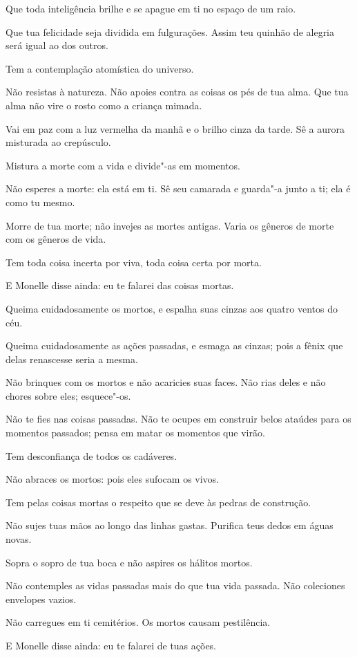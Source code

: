 Que toda inteligência brilhe e se apague em ti no espaço de um raio.

Que tua felicidade seja dividida em fulgurações. Assim teu quinhão de
alegria será igual ao dos outros.

Tem a contemplação atomística do universo.

Não resistas à natureza. Não apoies contra as coisas os pés de tua
alma. Que tua alma não vire o rosto como a criança mimada.

Vai em paz com a luz vermelha da manhã e o brilho cinza da tarde. Sê a
aurora misturada ao crepúsculo.

Mistura a morte com a vida e divide"-as em momentos.

Não esperes a morte: ela está em ti. Sê seu camarada e guarda"-a junto a
ti; ela é como tu mesmo.

Morre de tua morte; não invejes as mortes antigas. Varia os gêneros de
morte com os gêneros de vida.

Tem toda coisa incerta por viva, toda coisa certa por morta.

E Monelle disse ainda: eu te falarei das coisas \mbox{mortas.}

Queima cuidadosamente os mortos, e espalha suas cinzas aos quatro
ventos do céu.

Queima cuidadosamente as ações passadas, e esmaga as cinzas; pois a
fênix que delas renascesse seria a mesma.

Não brinques com os mortos e não acaricies suas faces. Não rias deles e
não chores sobre eles; esquece"-os.

Não te fies nas coisas passadas. Não te ocupes em construir belos
ataúdes para os momentos passados; pensa em matar os momentos que virão.

Tem desconfiança de todos os cadáveres.

Não abraces os mortos: pois eles sufocam os vivos.

Tem pelas coisas mortas o respeito que se deve às pedras de construção.

Não sujes tuas mãos ao longo das linhas gastas. Purifica teus dedos em
águas novas.

Sopra o sopro de tua boca e não aspires os hálitos mortos.

Não contemples as vidas passadas mais do que tua vida passada. Não
coleciones envelopes vazios.

Não carregues em ti cemitérios. Os mortos causam pestilência.

E Monelle disse ainda: eu te falarei de tuas ações.

